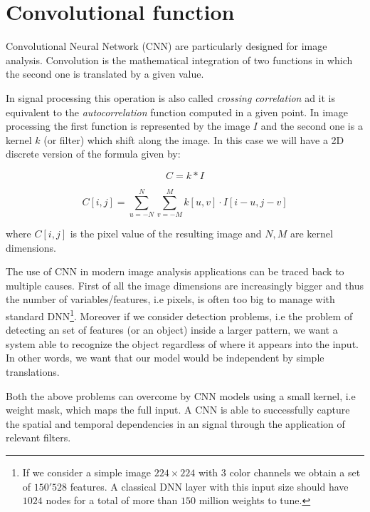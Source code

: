 \documentclass{standalone}
\begin{document}
\section[Convolutional]{Convolutional function}\label{convolutional}

Convolutional Neural Network (CNN) are particularly designed for image analysis.
Convolution is the mathematical integration of two functions in which the second one is translated by a given value.

In signal processing this operation is also called \emph{crossing correlation} ad it is equivalent to the \emph{autocorrelation} function computed in a given point.
In image processing the first function is represented by the image $I$ and the second one is a kernel $k$ (or filter) which shift along the image.
In this case we will have a 2D discrete version of the formula given by:

$$
C = k * I
$$

$$
C[i, j] = \sum_{u=-N}^{N} \sum_{v=-M}^{M} k[u, v] \cdot I[i - u, j - v]
$$

where $C[i, j]$ is the pixel value of the resulting image and $N, M$ are kernel dimensions.

The use of CNN in modern image analysis applications can be traced back to multiple causes.
First of all the image dimensions are increasingly bigger and thus the number of variables/features, i.e pixels, is often too big to manage with standard DNN\footnote{
  If we consider a simple image $224\times224$ with $3$ color channels we obtain a set of $150'528$ features.
  A classical DNN layer with this input size should have $1024$ nodes for a total of more than $150$ million weights to tune.
}.
Moreover if we consider detection problems, i.e the problem of detecting an set of features (or an object) inside a larger pattern, we want a system able to recognize the object regardless of where it appears into the input.
In other words, we want that our model would be independent by simple translations.

Both the above problems can overcome by CNN models using a small kernel, i.e weight mask, which maps the full input.
A CNN is able to successfully capture the spatial and temporal dependencies in an signal through the application of relevant filters.


\end{document}
